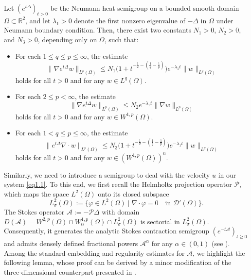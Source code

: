 \documentclass[reqno]{amsart}
\begin{document}
\begin{lemma}\label{lem2.6}
Let $(e^{t\Delta})_{t > 0}$ be the Neumann heat semigroup on a bounded smooth domain 
\(\Omega\subset \mathbb{R}^2\), and let $\lambda_1 > 0$ denote the first nonzero 
eigenvalue of $-\Delta$ in $\Omega$ under Neumann boundary condition. 
Then, there exist two constants $N_1>0$, $N_2>0$, and $N_3 > 0$, depending only on 
$\Omega$, such that:
\begin{itemize}
\item[(i)] For each $1 \leq q \leq p \leq \infty$, the estimate
\begin{equation}\label{9.12-6}
\|\nabla e^{t\Delta}  w\|_{L^p(\Omega)} 
\leq N_1 \Big(1 + t^{-\frac{1}{2}-\left(\frac{1}{q} - \frac{1}{p}\right)}\Big) 
e^{-\lambda_1 t} \|w\|_{L^q(\Omega)}
\end{equation}
holds for all $t > 0$ and for any $w \in L^{q}(\Omega)$.

\item[(ii)] For each \(2 \leq p < \infty\), the estimate
\begin{equation}\label{1.18-6}
\|\nabla e^{t\Delta} w\|_{L^p(\Omega)} 
\leq N_2 e^{-\lambda_1 t} \|\nabla w\|_{L^p(\Omega)}
\end{equation}
holds for all $t > 0$ and for any \(w \in W^{1,p}(\Omega)\).

\item[(iii)] For each $1 < q \leq p \leq \infty$, the estimate
\begin{equation}\label{9.12-6-2}
\|e^{t\Delta}\nabla \cdot w\|_{L^p(\Omega)} 
\leq N_3 \Big(1 + t^{-\frac{1}{2} - \left(\frac{1}{q} 
- \frac{1}{p}\right)}\Big) e^{-\lambda_1 t} \|w\|_{L^q(\Omega)}
\end{equation}
holds for all $t > 0$ and for any $w \in (W^{1,p}(\Omega))^n$.
\end{itemize}
\end{lemma}

Similarly, we need to introduce a semigroup to deal with the velocity $u$ 
in our system \eqref{eq1.1}. To this end,  we first recall the Helmholtz projection 
operator \(\mathcal{P}\), which maps the space $L^2(\Omega)$ onto its closed subspace
\[
L_\sigma^2(\Omega) := \{\varphi \in L^2(\Omega) \mid \nabla \cdot \varphi 
= 0 \quad \text{in } \mathcal{D}'(\Omega)\}.
\]
The Stokes operator $\mathcal{A} := -\mathcal{P}\Delta$ with domain 
$D(\mathcal{A}) = W^{2,p}(\Omega) \cap W_0^{1,p}(\Omega) \cap L_\sigma^2(\Omega)$
is sectorial in $L_\sigma^2(\Omega)$. Consequently, it generates the analytic Stokes 
contraction semigroup $(e^{-t\mathcal{A}})_{t\geq0}$ and admits
densely defined fractional powers $\mathcal{A}^\alpha$ for any 
$\alpha \in (0,1)$ (see \cite{Giga-1991, Sohr-2001}). 
Among the standard embedding and regularity estimates for 
\(\mathcal{A}\), we highlight the following lemma, whose proof can be derived by 
a minor modification of the three-dimensional counterpart presented in 
\cite[Lemma 3.1--3.3]{Winkler-2015}.
\end{document}
